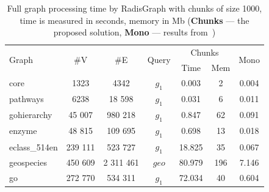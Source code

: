 {\setlength{\tabcolsep}{0.25em}
\begin{table}
{
\caption{Full graph processing time by RadisGraph with chunks of size 1000, time is measured in seconds, memory in Mb (\textbf{Chunks} --- the proposed solution, \textbf{Mono} --- results from~\cite{10.1145/3398682.3399163})}
\label{tbl:redis_full_graph_processing}
\small
{}
\begin{tabular}{|l|c|c|c|c|c|c|}
\hline
\multirow{2}{*}{Graph} & \multirow{2}{*}{\#V} & \multirow{2}{*}{\#E} & \multirow{2}{*}{Query} & \multicolumn{2}{c|}{Chunks}  &  \multirow{2}{*}{Mono}  \\
                       &                      &                      &                        & Time   & Mem & \\
\hline
\hline
core                   & 1323                 & 4342                 & $g_1$                  & 0.003  & 2                  &  0.004 \\
pathways               & 6238                 & 18 598               & $g_1$                  & 0.031  & 6                  &  0.011 \\
gohierarchy            & 45 007               & 980 218              & $g_1$                  & 0.847  & 62                  &  0.091 \\
enzyme                 & 48 815               & 109 695              & $g_1$                  & 0.698  & 13                  &  0.018 \\
eclass\_514en          & 239 111              & 523 727              & $g_1$                  & 18.825 & 35                   &  0.067 \\
geospecies             & 450 609              & 2 311 461            & $geo$                  & 80.979 & 196                  &  7.146 \\
go                     & 272 770              & 534 311              & $g_1$                  & 72.034 & 40                  &  0.604 \\
\hline
\end{tabular}
}
\end{table}
}

